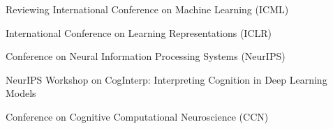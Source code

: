 
\begin{rubric}{Reviewing}
	\entry*[2026]
	International Conference on Machine Learning (ICML) \par
	\entry*[2025]
	International Conference on Learning Representations (ICLR) \par
	\entry*[2025]
	Conference on Neural Information Processing Systems (NeurIPS) \par
	\entry*[2025]
	NeurIPS Workshop on CogInterp: Interpreting Cognition in Deep Learning Models  \par
	\entry*[2025]
	Conference on Cognitive Computational Neuroscience (CCN) \par
\end{rubric}
